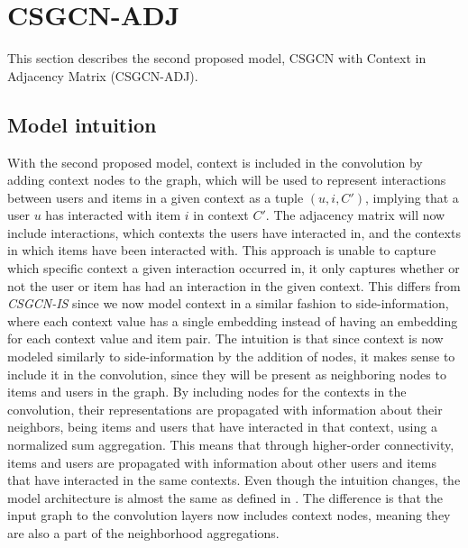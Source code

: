 \section{CSGCN-ADJ}\label{sec:csgcn_adj}
This section describes the second proposed model, CSGCN with Context in Adjacency Matrix (CSGCN-ADJ).

\subsection{Model intuition}\label{subsec:csgcn_adj_intuition}
With the second proposed model, context is included in the convolution by adding context nodes to the graph, which will be used to represent interactions between users and items in a given context as a tuple $(u,i,C')$, implying that a user $u$ has interacted with item $i$ in context $C'$.
The adjacency matrix will now include interactions, which contexts the users have interacted in, and the contexts in which items have been interacted with.
This approach is unable to capture which specific context a given interaction occurred in, it only captures whether or not the user or item has had an interaction in the given context.
This differs from \textit{CSGCN-IS} since we now model context in a similar fashion to side-information, where each context value has a single embedding instead of having an embedding for each context value and item pair.
The intuition is that since context is now modeled similarly to side-information by the addition of nodes, it makes sense to include it in the convolution, since they will be present as neighboring nodes to items and users in the graph.
By including nodes for the contexts in the convolution, their representations are propagated with information about their neighbors, being items and users that have interacted in that context, using a normalized sum aggregation.
This means that through higher-order connectivity, items and users are propagated with information about other users and items that have interacted in the same contexts.
Even though the intuition changes, the model architecture is almost the same as defined in .
The difference is that the input graph to the convolution layers now includes context nodes, meaning they are also a part of the neighborhood aggregations.

